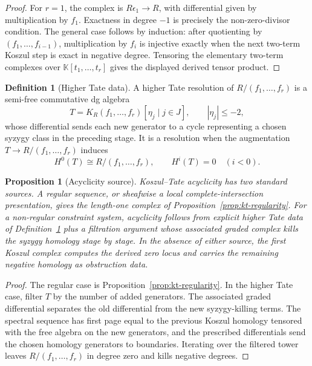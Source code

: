\documentclass[11pt]{amsart}
\newtheorem{proposition}[theorem]{Proposition}
\theoremstyle{definition}
\newtheorem{definition}[theorem]{Definition}
\theoremstyle{remark}
\begin{document}
\begin{proof}
For $r=1$, the complex is $R\epsilon_1\to R$, with differential given by
multiplication by $f_1$. Exactness in degree $-1$ is precisely the
non-zero-divisor condition. The general case follows by induction:
after quotienting by $(f_1,\ldots,f_{i-1})$, multiplication by $f_i$ is
injective exactly when the next two-term Koszul step is exact in
negative degree. Tensoring the elementary two-term complexes over
$\mathbb K[t_1,\ldots,t_r]$ gives the displayed derived tensor product.
\end{proof}

\begin{definition}[Higher Tate data]
\label{def:higher-tate-data}
A higher Tate resolution of $R/(f_1,\ldots,f_r)$ is a semi-free
commutative dg algebra
\[
T=
K_R(f_1,\ldots,f_r)[\eta_j\mid j\in J],
\qquad |\eta_j|\leq -2,
\]
whose differential sends each new generator to a cycle representing a
chosen syzygy class in the preceding stage. It is a resolution when the
augmentation $T\to R/(f_1,\ldots,f_r)$ induces
\[
H^0(T)\cong R/(f_1,\ldots,f_r),
\qquad
H^i(T)=0\quad (i<0).
\]
\end{definition}

\begin{proposition}[Acyclicity source]
\label{prop:kt-acyclicity-source}
Koszul--Tate acyclicity has two standard sources. A regular sequence,
or sheafwise a local complete-intersection presentation, gives the
length-one complex of Proposition~\ref{prop:kt-regularity}. For a
non-regular constraint system, acyclicity follows from explicit higher
Tate data of Definition~\ref{def:higher-tate-data} plus a filtration
argument whose associated graded complex kills the syzygy homology stage
by stage. In the absence of either source, the first Koszul complex
computes the derived zero locus and carries the remaining negative
homology as obstruction data.
\end{proposition}

\begin{proof}
The regular case is Proposition~\ref{prop:kt-regularity}. In the higher
Tate case, filter $T$ by the number of added generators. The associated
graded differential separates the old differential from the new
syzygy-killing terms. The spectral sequence has first page equal to the
previous Koszul homology tensored with the free algebra on the new
generators, and the prescribed differentials send the chosen homology
generators to boundaries. Iterating over the filtered tower leaves
$R/(f_1,\ldots,f_r)$ in degree zero and kills negative degrees.
\end{proof}
\end{document}
